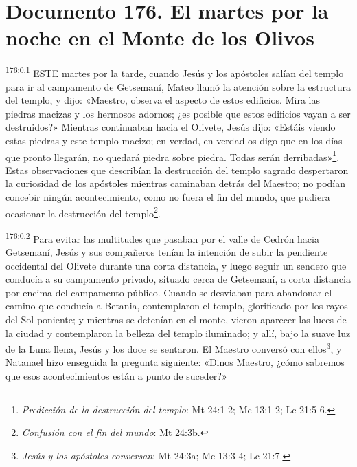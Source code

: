 \chapter{Documento 176. El martes por la noche en el Monte de los Olivos}
\par 
\textsuperscript{176:0.1} ESTE martes por la tarde, cuando Jesús y los apóstoles salían del templo para ir al campamento de Getsemaní, Mateo llamó la atención sobre la estructura del templo, y dijo: «Maestro, observa el aspecto de estos edificios. Mira las piedras macizas y los hermosos adornos; ¿es posible que estos edificios vayan a ser destruidos?» Mientras continuaban hacia el Olivete, Jesús dijo: «Estáis viendo estas piedras y este templo macizo; en verdad, en verdad os digo que en los días que pronto llegarán, no quedará piedra sobre piedra. Todas serán derribadas»\footnote{\textit{Predicción de la destrucción del templo}: Mt 24:1-2; Mc 13:1-2; Lc 21:5-6.}. Estas observaciones que describían la destrucción del templo sagrado despertaron la curiosidad de los apóstoles mientras caminaban detrás del Maestro; no podían concebir ningún acontecimiento, como no fuera el fin del mundo, que pudiera ocasionar la destrucción del templo\footnote{\textit{Confusión con el fin del mundo}: Mt 24:3b.}.

\par 
\textsuperscript{176:0.2} Para evitar las multitudes que pasaban por el valle de Cedrón hacia Getsemaní, Jesús y sus compañeros tenían la intención de subir la pendiente occidental del Olivete durante una corta distancia, y luego seguir un sendero que conducía a su campamento privado, situado cerca de Getsemaní, a corta distancia por encima del campamento público. Cuando se desviaban para abandonar el camino que conducía a Betania, contemplaron el templo, glorificado por los rayos del Sol poniente; y mientras se detenían en el monte, vieron aparecer las luces de la ciudad y contemplaron la belleza del templo iluminado; y allí, bajo la suave luz de la Luna llena, Jesús y los doce se sentaron. El Maestro conversó con ellos\footnote{\textit{Jesús y los apóstoles conversan}: Mt 24:3a; Mc 13:3-4; Lc 21:7.}, y Natanael hizo enseguida la pregunta siguiente: «Dinos Maestro, ¿cómo sabremos que esos acontecimientos están a punto de suceder?»

